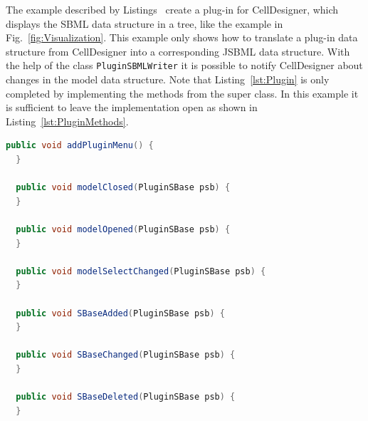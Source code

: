 \documentclass[
  letterpaper,
  11pt,
  headsepline,
  pointlessnumbers,
  tablecaptionabove,
  headinclude,
  appendixprefix,
  idxtotoc,
  bibtotoc,
  titlepage
]{scrartcl}
\begin{document}
The example described by Listings~
create a plug-in for CellDesigner, which displays the SBML data structure
in a tree, like the example in Fig.~\vref{fig:Visualization}. This example only
shows how to translate a plug-in data structure
from CellDesigner into a corresponding JSBML data structure. With the help of
the class \verb!PluginSBMLWriter! it is possible to notify CellDesigner about
changes in the model data structure. Note that Listing~\vref{lst:Plugin} is only
completed by implementing the methods from the super class. In this example it
is sufficient to leave the implementation open as shown in
Listing~\vref{lst:PluginMethods}.
\begin{lstlisting}[language=Java,float,caption={Empty implementation of the
methods from the abstract class \texttt{CellDesignerPlugin}},
label=lst:PluginMethods]
  public void addPluginMenu() {
  }

  public void modelClosed(PluginSBase psb) {
  }

  public void modelOpened(PluginSBase psb) {
  }

  public void modelSelectChanged(PluginSBase psb) {
  }

  public void SBaseAdded(PluginSBase psb) {
  }

  public void SBaseChanged(PluginSBase psb) {
  }

  public void SBaseDeleted(PluginSBase psb) {
  }
\end{lstlisting}



\end{document}
